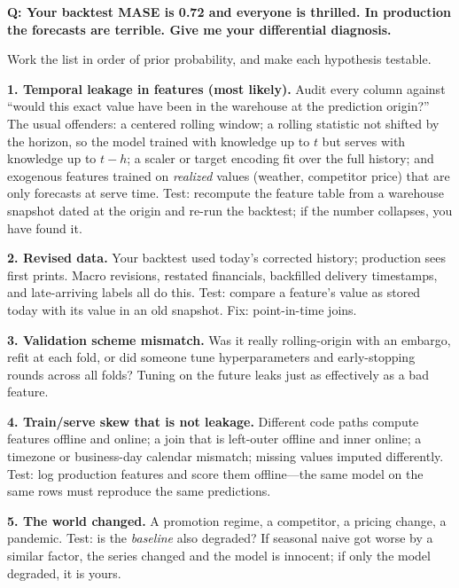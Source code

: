\begin{interviewq}
\textbf{Q: Your backtest MASE is 0.72 and everyone is thrilled. In production the forecasts are terrible. Give me your differential diagnosis.}

 \quad {} \quad \badgefreq{\freqhigh}

\stronganswer

Work the list in order of prior probability, and make each hypothesis testable.

\textbf{1. Temporal leakage in features (most likely).} Audit every column against ``would this exact value have been in the warehouse at the prediction origin?'' The usual offenders: a centered rolling window; a rolling statistic not shifted by the horizon, so the model trained with knowledge up to $t$ but serves with knowledge up to $t-h$; a scaler or target encoding fit over the full history; and exogenous features trained on \emph{realized} values (weather, competitor price) that are only forecasts at serve time. Test: recompute the feature table from a warehouse snapshot dated at the origin and re-run the backtest; if the number collapses, you have found it.

\textbf{2. Revised data.} Your backtest used today's corrected history; production sees first prints. Macro revisions, restated financials, backfilled delivery timestamps, and late-arriving labels all do this. Test: compare a feature's value as stored today with its value in an old snapshot. Fix: point-in-time joins.

\textbf{3. Validation scheme mismatch.} Was it really rolling-origin with an embargo, refit at each fold, or did someone tune hyperparameters and early-stopping rounds across all folds? Tuning on the future leaks just as effectively as a bad feature.

\textbf{4. Train/serve skew that is not leakage.} Different code paths compute features offline and online; a join that is left-outer offline and inner online; a timezone or business-day calendar mismatch; missing values imputed differently. Test: log production features and score them offline---the same model on the same rows must reproduce the same predictions.

\textbf{5. The world changed.} A promotion regime, a competitor, a pricing change, a pandemic. Test: is the \emph{baseline} also degraded? If seasonal naive got worse by a similar factor, the series changed and the model is innocent; if only the model degraded, it is yours.


\end{interviewq}
